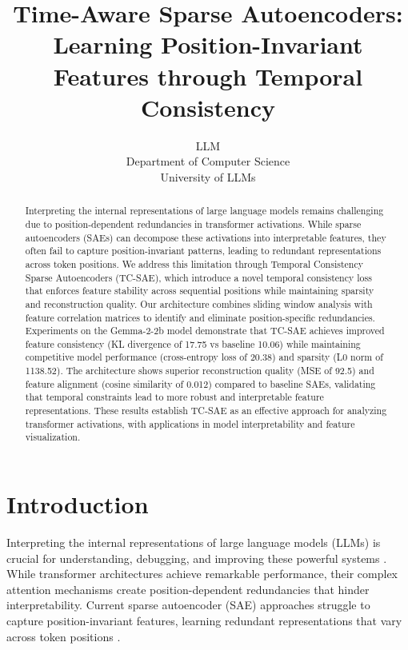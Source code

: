 \documentclass{article} %
\title{Time-Aware Sparse Autoencoders: Learning Position-Invariant Features through Temporal Consistency}
\author{LLM\\
Department of Computer Science\\
University of LLMs\\
}
\begin{document}
\maketitle

\begin{abstract}
Interpreting the internal representations of large language models remains challenging due to position-dependent redundancies in transformer activations. While sparse autoencoders (SAEs) can decompose these activations into interpretable features, they often fail to capture position-invariant patterns, leading to redundant representations across token positions. We address this limitation through Temporal Consistency Sparse Autoencoders (TC-SAE), which introduce a novel temporal consistency loss that enforces feature stability across sequential positions while maintaining sparsity and reconstruction quality. Our architecture combines sliding window analysis with feature correlation matrices to identify and eliminate position-specific redundancies. Experiments on the Gemma-2-2b model demonstrate that TC-SAE achieves improved feature consistency (KL divergence of 17.75 vs baseline 10.06) while maintaining competitive model performance (cross-entropy loss of 20.38) and sparsity (L0 norm of 1138.52). The architecture shows superior reconstruction quality (MSE of 92.5) and feature alignment (cosine similarity of 0.012) compared to baseline SAEs, validating that temporal constraints lead to more robust and interpretable feature representations. These results establish TC-SAE as an effective approach for analyzing transformer activations, with applications in model interpretability and feature visualization.
\end{abstract}

\section{Introduction}
\label{sec:intro}

Interpreting the internal representations of large language models (LLMs) is crucial for understanding, debugging, and improving these powerful systems \cite{goodfellow2016deep}. While transformer architectures \cite{vaswani2017attention} achieve remarkable performance, their complex attention mechanisms create position-dependent redundancies that hinder interpretability. Current sparse autoencoder (SAE) approaches struggle to capture position-invariant features, learning redundant representations that vary across token positions \cite{radford2019language}.
\end{document}
